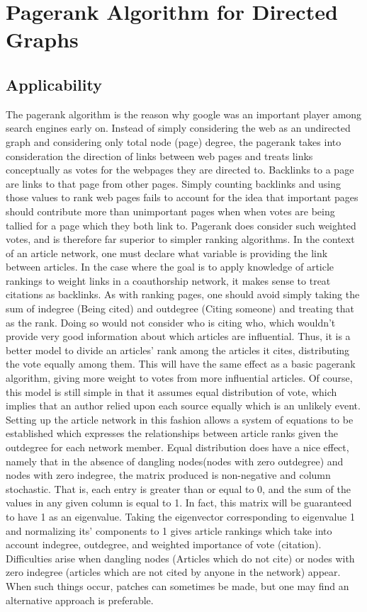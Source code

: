 \documentclass[12pt]{article} %
\begin{document}
\section{Pagerank Algorithm for Directed Graphs}
  \subsection{Applicability}
    The pagerank algorithm is the reason why google was an important player among search engines early on. Instead of simply considering the web as an undirected graph and considering only total node (page) degree, the pagerank takes into consideration the direction of links between web pages and treats links conceptually as votes for the webpages they are directed to. Backlinks to a page are links to that page from other pages. Simply counting backlinks and using those values to rank web pages fails to account for the idea that important pages should contribute more than unimportant pages when when votes are being tallied for a page which they both link to. Pagerank does consider such weighted votes, and is therefore far superior to simpler ranking algorithms. 
      In the context of an article network, one must declare what variable is providing the link between articles. In the case where the goal is to apply knowledge of article rankings to weight links in a coauthorship network, it makes sense to treat citations as backlinks. As with ranking pages, one should avoid simply taking the sum of indegree (Being cited) and outdegree (Citing someone) and treating that as the rank. Doing so would not consider who is citing who, which wouldn't provide very good information about which articles are influential. Thus, it is a better model to  divide an articles' rank among the articles it cites, distributing the vote equally among them. This will have the same effect as a basic pagerank algorithm, giving more weight to votes from more influential articles. Of course, this model is still simple in that it assumes equal distribution of vote, which implies that an author relied upon each source equally which is an unlikely event. Setting up the article network in this fashion allows a system of equations to be established which expresses the relationships between article ranks given the outdegree for each network member. Equal distribution does have a nice effect, namely that in the absence of dangling nodes(nodes with zero outdegree) and nodes with zero indegree, the matrix produced is non-negative and column stochastic. That is, each entry is greater than or equal to 0, and the sum of the values in any given column is equal to 1. In fact, this matrix will be guaranteed to have 1 as an eigenvalue. Taking the eigenvector corresponding to eigenvalue 1 and normalizing its' components to 1 gives article rankings which take into account indegree, outdegree, and weighted importance of vote (citation). Difficulties arise when dangling nodes (Articles which do not cite) or nodes with zero indegree (articles which are not cited by anyone in the network) appear. When such things occur, patches can sometimes be made, but one may find an alternative approach is preferable.
      
\end{document}
